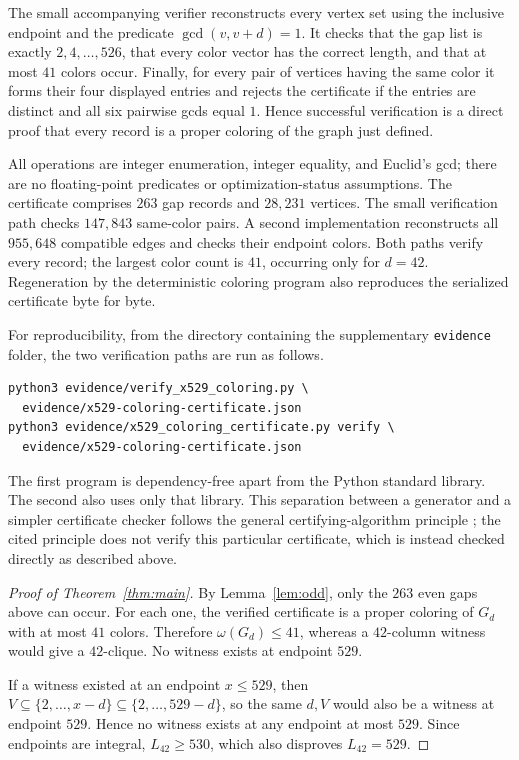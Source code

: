 \documentclass[11pt]{article}
\begin{document}
The small accompanying verifier reconstructs every vertex set using the
inclusive endpoint and the predicate $\gcd(v,v+d)=1$.  It checks that the gap
list is exactly $2,4,\ldots,526$, that every color vector has the correct
length, and that at most $41$ colors occur.  Finally, for every pair of
vertices having the same color it forms their four displayed entries and
rejects the certificate if the entries are distinct and all six pairwise
gcds equal $1$.  Hence successful verification is a direct proof that every
record is a proper coloring of the graph just defined.

All operations are integer enumeration, integer equality, and Euclid's gcd;
there are no floating-point predicates or optimization-status assumptions.
The certificate comprises $263$ gap records and $28{,}231$ vertices.  The
small verification path checks $147{,}843$ same-color pairs.  A second
implementation reconstructs all $955{,}648$ compatible edges and checks
their endpoint colors.  Both paths verify every record; the largest color
count is $41$, occurring only for $d=42$.  Regeneration by the deterministic
coloring program also reproduces the serialized certificate byte for byte.

For reproducibility, from the directory containing the supplementary
\texttt{evidence} folder, the two verification paths are run as follows.
\begin{verbatim}
python3 evidence/verify_x529_coloring.py \
  evidence/x529-coloring-certificate.json
python3 evidence/x529_coloring_certificate.py verify \
  evidence/x529-coloring-certificate.json
\end{verbatim}
The first program is dependency-free apart from the Python standard library.
The second also uses only that library.  This separation between a generator
and a simpler certificate checker follows the general certifying-algorithm
principle \cite{McConnellEtAl2011}; the cited principle does not verify this
particular certificate, which is instead checked directly as described above.

\begin{proof}[Proof of Theorem~\ref{thm:main}]
By Lemma~\ref{lem:odd}, only the $263$ even gaps above can occur.  For each
one, the verified certificate is a proper coloring of $G_d$ with at most
$41$ colors.  Therefore $\omega(G_d)\leq41$, whereas a $42$-column witness
would give a $42$-clique.  No witness exists at endpoint $529$.

If a witness existed at an endpoint $x\leq529$, then
$V\subseteq\{2,\ldots,x-d\}\subseteq\{2,\ldots,529-d\}$, so the same
$d,V$ would also be a witness at endpoint $529$.  Hence no witness exists at
any endpoint at most $529$.  Since endpoints are integral,
$L_{42}\geq530$, which also disproves $L_{42}=529$.
\end{proof}
\end{document}
